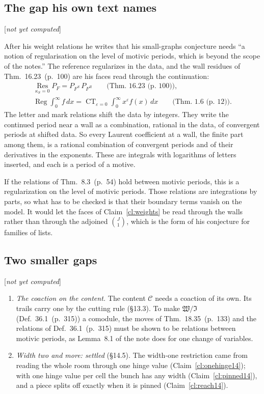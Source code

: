 \documentclass[11pt]{article}
\DeclareMathOperator{\Reg}{Reg}
\DeclareMathOperator*{\CT}{CT}
\newcommand{\status}[1]{\hfill{\small[\textit{#1}]}}
\newcommand{\hb}[2]{#1~(p.~#2)}   %
\theoremstyle{plain}
\theoremstyle{remark}
\begin{document}
\subsection{The gap his own text names}\status{not yet computed}

After his weight relations he writes that his small-graphs conjecture needs ``a notion of regularisation on the level of motivic periods, which is beyond the scope of the notes.'' The reference regularizes in the data, and the wall residues of Thm.~\hb{16.23}{100} are his faces read through the continuation:
\begin{gather*}
\operatorname*{Res}_{\kappa_S=0}P_F=P_{F^S}\,P_{F^R}\qquad\text{(Thm.~\hb{16.23}{100})},\\
\Reg\!\int_0^\infty f\,dx=\CT_{\varepsilon=0}\int_0^\infty x^{\varepsilon}f(x)\,dx\qquad\text{(Thm.~\hb{1.6}{12})}.
\end{gather*}
The letter and mark relations shift the data by integers. They write the continued period near a wall as a combination, rational in the data, of convergent periods at shifted data. So every Laurent coefficient at a wall, the finite part among them, is a rational combination of convergent periods and of their derivatives in the exponents. These are integrals with logarithms of letters inserted, and each is a period of a motive.

If the relations of Thm.~\hb{8.3}{54} hold between motivic periods, this is a regularization on the level of motivic periods. Those relations are integrations by parts, so what has to be checked is that their boundary terms vanish on the model. It would let the faces of Claim~\ref{cl:weights} be read through the walls rather than through the adjoined $\binom J1$, which is the form of his conjecture for families of lists.

\subsection{Two smaller gaps}\status{not yet computed}

\begin{enumerate}[label=(\arabic*)]
\item \emph{The coaction on the content.} The content $\mathcal C$ needs a coaction of its own. Its trails carry one by the cutting rule (\S13.3). To make $\mathfrak W/\mathfrak I$ (Def.~\hb{36.1}{315}) a comodule, the moves of Thm.~\hb{18.35}{133} and the relations of Def.~\hb{36.1}{315} must be shown to be relations between motivic periods, as Lemma~8.1 of the note does for one change of variables.
\item \emph{Width two and more: settled} (\S14.5). The width-one restriction came from reading the whole room through one hinge value (Claim~\ref{cl:onehinge14}); with one hinge value per cell the bunch has any width (Claim~\ref{cl:pinned14}), and a piece splits off exactly when it is pinned (Claim~\ref{cl:reach14}).
\end{enumerate}
\end{document}
